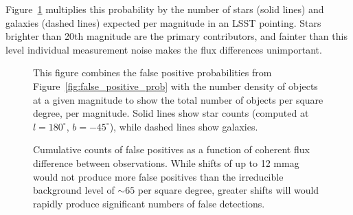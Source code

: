 \documentclass[DM,toc]{lsstdoc}
\begin{document}
Figure~\ref{fig:false_positive_differential} multiplies this probability by the
number of stars (solid lines) and galaxies (dashed lines) expected per magnitude
in an LSST pointing. Stars brighter than 20th magnitude are the primary
contributors, and fainter than this level individual measurement noise makes the
flux differences unimportant.

\begin{figure}
\caption{This figure combines the false positive probabilities from
Figure~\ref{fig:false_positive_prob} with the number density of objects at a
given magnitude to show the total number of objects per square degree, per magnitude.
Solid lines show star counts (computed at $l=180^\circ$, $b=-45^\circ$), while
dashed lines show galaxies.
\label{fig:false_positive_differential}}
\end{figure}

\begin{figure}
\caption{Cumulative counts of false positives as a function of coherent flux
difference between observations. While shifts of up to 12 mmag would not produce
more false positives than the irreducible background level of $\sim 65$ per
square degree, greater shifts will would rapidly produce significant numbers of
false detections.
\label{fig:fp_vs_flux_shift}}
\end{figure}
\end{document}
